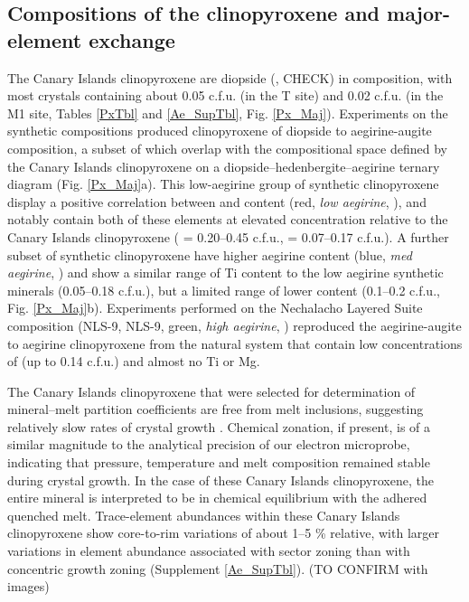 \documentclass[review,authoryear,12pt]{elsarticle}
\begin{document}

\subsection{Compositions of the clinopyroxene and major-element exchange}
The Canary Islands clinopyroxene are diopside (,  CHECK) in composition, with most crystals containing about 0.05 c.f.u.  (in the T site) and 0.02 c.f.u.  (in the M1 site, Tables \ref{PxTbl} and \ref{Ae_SupTbl}, Fig. \ref{Px_Maj}). 
Experiments on the synthetic compositions produced clinopyroxene of diopside to aegirine-augite composition, a subset of which overlap with the compositional space defined by the Canary Islands clinopyroxene on a diopside--hedenbergite--aegirine ternary diagram (Fig. \ref{Px_Maj}a). This low-aegirine group of synthetic clinopyroxene display a positive correlation between  and  content (red, \emph{low aegirine}, ), and notably contain both of these elements at elevated concentration relative to the Canary Islands clinopyroxene ( = 0.20--0.45 c.f.u.,  = 0.07--0.17 c.f.u.). A further subset of synthetic clinopyroxene have higher aegirine content (blue, \emph{med aegirine}, ) and show a similar range of Ti content to the low aegirine synthetic minerals (0.05--0.18 c.f.u.), but a limited range of lower  content (0.1--0.2 c.f.u., Fig. \ref{Px_Maj}b). Experiments performed on the Nechalacho Layered Suite composition (NLS-9, NLS-9, green, \emph{high aegirine}, ) reproduced the aegirine-augite to aegirine clinopyroxene from the natural system \citep{Moller2016} that contain low concentrations of  (up to 0.14 c.f.u.) and almost no Ti or Mg.


 The Canary Islands clinopyroxene that were selected for determination of mineral--melt partition coefficients are free from melt inclusions, suggesting relatively slow rates of crystal growth \citep[][Fig. \ref{3_ChemTransect}]{Kennedy1993}. Chemical zonation, if present, is of a similar magnitude to the analytical precision of our electron microprobe, indicating that pressure, temperature and melt composition remained stable during crystal growth. In the case of these Canary Islands clinopyroxene, the entire mineral is interpreted to be in chemical equilibrium with the adhered quenched melt. %
Trace-element abundances within these Canary Islands clinopyroxene show core-to-rim variations of about 1--5 \% relative, with larger variations in element abundance associated with sector zoning than with concentric growth zoning (Supplement \ref{Ae_SupTbl}). (TO CONFIRM with images)
\end{document}
